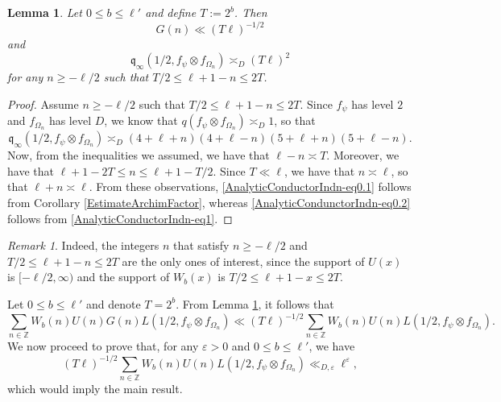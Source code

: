 \documentclass[11pt]{amsart}
\newcommand{\Z}{\mathbb{Z}}
\newtheorem{lemma}[theorem]{Lemma}
\theoremstyle{definition}
\theoremstyle{remark}
\newtheorem{remark}[theorem]{Remark}
\begin{document}
\begin{lemma}\label{AnalyticConductorIndn}
Let $0\leq b \leq \ell'$ and define $T:=2^{b}$. Then 
\begin{equation}
    G(n) \ll (T\ell)^{-1/2} \label{AnalyticConductorIndn-eq0.1}
\end{equation}
and \begin{equation}
    \mathfrak{q}_{\infty}(1/2,f_{\psi} \otimes f_{\Omega_n}) \asymp_{D} (T\ell)^2 \label{AnalyticCondunctorIndn-eq0.2}
\end{equation}
for any $n\geq -\ell/2$ such that $T/2 \leq \ell+1-n \leq 2T$.
\end{lemma}

\begin{proof}
Assume $n\geq -\ell/2$ such that $T/2 \leq \ell+1-n \leq 2T$. Since $f_{\psi}$ has level $2$ and $f_{\Omega_n}$ has level $D$, we know that $q(f_{\psi}\otimes f_{\Omega_n}) \asymp_{D} 1$, so that 
\begin{equation}
    \mathfrak{q}_{\infty}(1/2,f_{\psi}\otimes f_{\Omega_n}) \asymp_{D} (4+\ell+n)(4+\ell-n)(5+\ell+n)(5+\ell-n). \label{AnalyticConductorIndn-eq1}
\end{equation}
Now, from the inequalities we assumed, we have that $\ell-n \asymp T$. Moreover, we have that $\ell+1-2T \leq n \leq \ell+1-T/2$. Since $T \ll \ell$, we have that $n\asymp \ell$, so that $\ell+n \asymp \ell$. From these observations, \eqref{AnalyticConductorIndn-eq0.1} follows from Corollary \ref{EstimateArchimFactor}, whereas \eqref{AnalyticCondunctorIndn-eq0.2} follows from \eqref{AnalyticConductorIndn-eq1}.
\end{proof}

\begin{remark}
Indeed, the integers $n$ that satisfy $n\geq -\ell/2$ and $T/2 \leq \ell+1-n \leq 2T$ are the only ones of interest, since the support of $U(x)$ is $[-\ell/2,\infty)$ and the support of $W_{b}(x)$ is $T/2 \leq \ell+1-x \leq 2T$.
\end{remark}

Let $0\leq b \leq \ell'$ and denote $T=2^{b}$. From Lemma \ref{AnalyticConductorIndn}, it follows that 
\begin{equation}
    \sum_{n\in \Z} W_{b}(n) U(n) G(n) L(1/2,f_{\psi}\otimes f_{\Omega_n}) \ll (T\ell)^{-1/2} \sum_{n\in \Z} W_{b}(n) U(n) L(1/2,f_{\psi}\otimes f_{\Omega_n}). \label{MainBound4.5}
\end{equation}
We now proceed to prove that, for any $\varepsilon>0$ and $0\leq b \leq \ell'$, we have
\begin{equation*}
    (T\ell)^{-1/2} \sum_{n\in \Z} W_{b}(n) U(n) L(1/2,f_{\psi}\otimes f_{\Omega_n}) \ll_{D,\varepsilon} \ell^{\varepsilon},
\end{equation*}
which would imply the main result.
\end{document}
